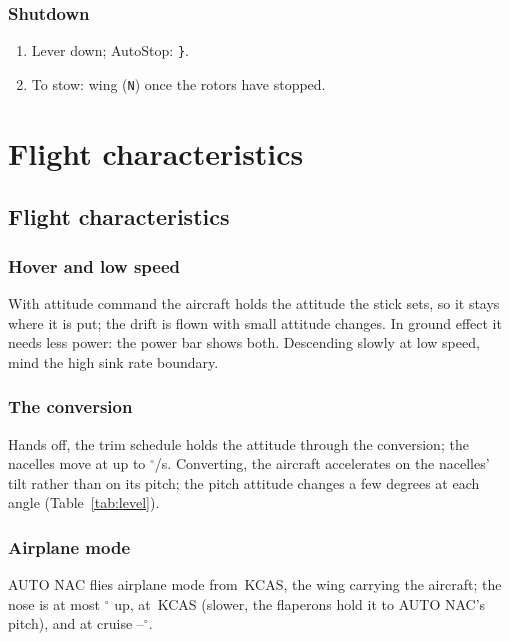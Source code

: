 \documentclass[11pt,a4paper,oneside]{book}
\newcommand{\Tab}[1]{}
\newcommand{\key}[1]{\texttt{#1}}
\begin{document}
\section{Shutdown}
\begin{enumerate}
\item Lever down; AutoStop: \key{\}}.
\item To stow: wing (\key{N}) once the rotors have stopped.
\end{enumerate}

\part{Flight characteristics}
\chapter{Flight characteristics}
\section{Hover and low speed}
With attitude command the aircraft holds the attitude the stick sets, so it stays where it is put; the drift is
flown with small attitude changes. In ground effect it needs less power: the power bar shows both. Descending slowly
at low speed, mind the high sink rate boundary.

\section{The conversion}
Hands off, the trim schedule holds the attitude through the conversion; the nacelles move at up to
\MNacRate$^\circ$/s. Converting, the aircraft accelerates on the nacelles' tilt rather than on its pitch; the pitch
attitude changes a few degrees at each angle (Table~\ref{tab:level}).

\section{Airplane mode}
AUTO NAC flies airplane mode from \MAplnKcas\,KCAS, the wing carrying the aircraft; the nose is at most \MPitchApln$^\circ$ up, at
\MPitchAplnKcas\,KCAS (slower, the flaperons hold it to AUTO NAC's pitch), and at cruise
\MPitchTwoSeventy--\MPitchTwoFifty$^\circ$.
\begin{table}[H]
\centering\small
\caption{Level flight along AUTO NAC's schedule at \MWRef\,lb, 1000\,ft: the power required, the pitch attitude, and
whether one engine (\MPoneThousand\,hp there) holds it.}\label{tab:level}
\Tab{level}
\end{table}
\end{document}
